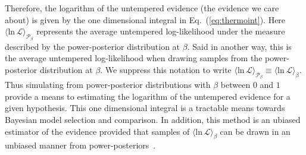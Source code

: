 Therefore, the logarithm of the untempered evidence (the evidence we care about) is given by the one dimensional integral in Eq.~(\ref{eq:thermoint}).
Here $\langle \mathrm{ln} \, \mathcal{L} \rangle_{\mathcal{P}_\beta}$ represents the average untempered log-likelihood under the measure described by the power-posterior distribution at $\beta$. Said in another way, this is the average untempered log-likelihood when drawing samples from the power-posterior distribution at $\beta$. We suppress this notation to write $\langle \mathrm{ln} \, \mathcal{L} \rangle_{\mathcal{P}_\beta} \equiv \langle \mathrm{ln} \, \mathcal{L} \rangle_\beta$. Thus simulating from power-posterior distributions with $\beta$ between $0$ and $1$ provide a means to estimating the logarithm of the untempered evidence for a given hypothesis. This one dimensional integral is a tractable means towards Bayesian model selection and comparison. In addition, this method is an ubiased estimator of the evidence provided that samples of $\langle \mathrm{ln} \, \mathcal{L} \rangle_\beta$ can be drawn in an unbiased manner from power-posteriors~\citep{carlson2016partition}.

